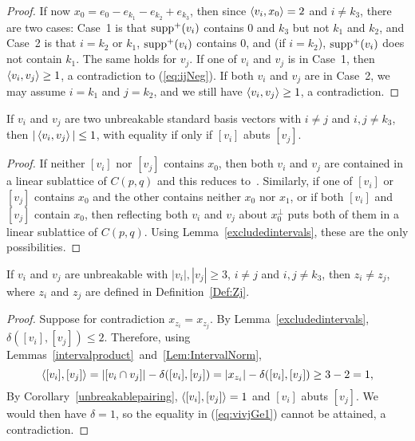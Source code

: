 \begin{proof}
If now $x_0 = e_0 - e_{k_1} - e_{k_2} + e_{k_3}$, then since $\left\langle v_i , x_0 \right\rangle = 2$ and $i \neq k_3$, there are two cases: Case~1 is that
$\operatorname{supp}^+(v_i)$ contains $0$ and $k_3$ but not $k_1$ and $k_2$, and Case~2 is that $i = k_2$ or $k_1$, $\operatorname{supp}^+(v_i)$ contains $0$, and (if $i = k_2$), $\operatorname{supp}^+(v_i)$ does not contain $k_1$. The same holds for $v_j$. 
If one of $v_i$ and $v_j$ is in Case~1, then $\left\langle v_i , v_j \right\rangle \ge 1$, a contradiction to (\ref{eq:ijNeg}). If both $v_i$ and $v_j$ are in Case~2, we may assume $i=k_1$ and $j=k_2$, and we still have $\left\langle v_i , v_j \right\rangle \ge 1$, a contradiction.
\end{proof}

\begin{cor}\label{unbreakablepairing}
If $v_i$ and $v_j$ are two unbreakable standard basis vectors with $i \neq j$ and $i,j \neq k_3$, then $|\left\langle v_i , v_j \right\rangle| \le 1$, with equality if only if $[v_i]$ abuts $[v_j]$. 
\end{cor}
\begin{proof}
If neither $[v_i]$ nor $[v_j]$ contains $x_0$, then both $v_i$ and $v_j$ are contained in a linear sublattice of $C(p,q)$ and this reduces to~\cite[Lemma~4.4]{greene:LSRP}. Similarly, if one of $[v_i]$ or $[v_j]$ contains $x_0$ and the other contains neither $x_0$ nor $x_1$, or if both $[v_i]$ and $[v_j]$ contain $x_0$, then reflecting both $v_i$ and $v_j$ about $x_0^{\perp}$ puts both of them in a linear sublattice of $C(p,q)$. Using Lemma~\ref{excludedintervals}, these are the only possibilities.
\end{proof}



\begin{cor}\label{Cor:ZjDistinct}
If $v_i$ and $v_j$ are unbreakable with $|v_i|,|v_j| \ge 3$, $i \neq j$ and $i,j \neq k_3$, then ${z_i} \neq {z_j}$, where ${z_i}$ and ${z_j}$ are defined in Definition~\ref{Def:Zj}.
\end{cor}
\begin{proof}
Suppose for contradiction $x_{z_i} = x_{z_j}$. By Lemma~\ref{excludedintervals}, $\delta([v_i],[v_j]) \le 2$. Therefore, using Lemmas~\ref{intervalproduct}~and~\ref{Lem:IntervalNorm},
\begin{equation}\label{eq:vivjGe1}
\left\langle [v_i] , [v_j] \right\rangle = |[v_i \cap v_j]| - \delta([v_i],[v_j]) = |x_{z_i}| - \delta([v_i],[v_j]) \ge 3 - 2 = 1,
\end{equation}
By Corollary~\ref{unbreakablepairing}, $\left\langle [v_i] , [v_j] \right\rangle =1$ and $[v_i]$ abuts $[v_j]$. We would then have $\delta=1$, so the equality in (\ref{eq:vivjGe1}) cannot be attained, a contradiction.
\end{proof}

